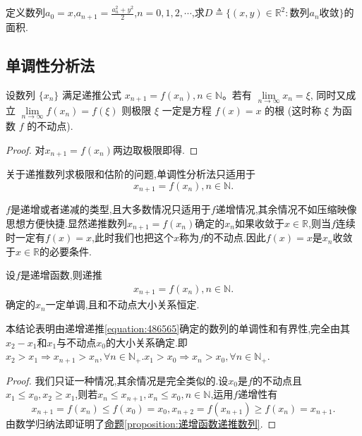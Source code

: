 \documentclass[../../main.tex]{subfiles}%
\begin{document}
\begin{example}
定义数列\(a_0 = x\),\(a_{n + 1}=\frac{a_{n}^{2}+y^{2}}{2}\),\(n = 0,1,2,\cdots\),求\(D\triangleq\{(x,y)\in\mathbb{R}^2:\text{数列}a_n\text{收敛}\}\)的面积.
\end{example}
\begin{solution}



\end{solution}





\subsection{单调性分析法}

\begin{proposition}[不动点]\label{proposition:不动点}
设数列 \(\{x_n\}\) 满足递推公式 \(x_{n+1} = f(x_n), n \in \mathbb{N}\)。若有 \(\lim\limits_{n \to \infty} x_n = \xi\), 同时又成立 \(\lim\limits_{n \to \infty} f(x_n) = f(\xi)\) 则极限 \(\xi\) 一定是方程 \(f(x) = x\) 的根 (这时称 \(\xi\) 为函数 \(f\) 的不动点).
\end{proposition}
\begin{proof}

对$x_{n+1} = f(x_n)$两边取极限即得.

\end{proof}

关于递推数列求极限和估阶的问题,单调性分析法只适用于
\[
x_{n + 1} = f(x_n),n \in \mathbb{N}.
\]

\(f\)是递增或者递减的类型,且大多数情况只适用于\(f\)递增情况,其余情况不如压缩映像思想方便快捷.显然递推数列$x_{n + 1} = f(x_n)$确定的\(x_n\)如果收敛于\(x \in \mathbb{R}\),则当\(f\)连续时一定有\(f(x) = x\),此时我们也把这个\(x\)称为\(f\)的不动点.因此\(f(x) = x\)是\(x_n\)收敛于\(x \in \mathbb{R}\)的必要条件.



\begin{proposition}[递增函数递推数列]\label{proposition:递增函数递推数列}
设\(f\)是递增函数,则递推
\begin{align}\label{equation:486565}
x_{n + 1} = f(x_n),n \in \mathbb{N}.
\end{align}
确定的\(x_n\)一定单调,且和不动点大小关系恒定.
\end{proposition}
\begin{note}
本结论表明由递增递推\eqref{equation:486565}确定的数列的单调性和有界性,完全由其\(x_2 - x_1\)和\(x_1\)与不动点$x_0$的大小关系确定.即$x_2>x_1\Rightarrow x_{n+1}>x_n,\forall n\in \mathbb{N} _+.x_1>x_0\Rightarrow x_n>x_0,\forall n\in \mathbb{N} _+$.
\end{note}
\begin{proof}

我们只证一种情况,其余情况是完全类似的.设\(x_0\)是\(f\)的不动点且\(x_1\leqslant  x_0,x_2\geqslant  x_1\),则若\(x_n\leqslant  x_{n + 1},x_n\leqslant  x_0,n\in\mathbb{N}\),运用\(f\)递增性有
\[
x_{n + 1} = f(x_n)\leqslant  f(x_0) = x_0,x_{n + 2} = f(x_{n + 1})\geqslant  f(x_n) = x_{n + 1}.
\]
由数学归纳法即证明了\hyperref[proposition:递增函数递推数列]{命题\ref{proposition:递增函数递推数列}}.

\end{proof}
\end{document}
